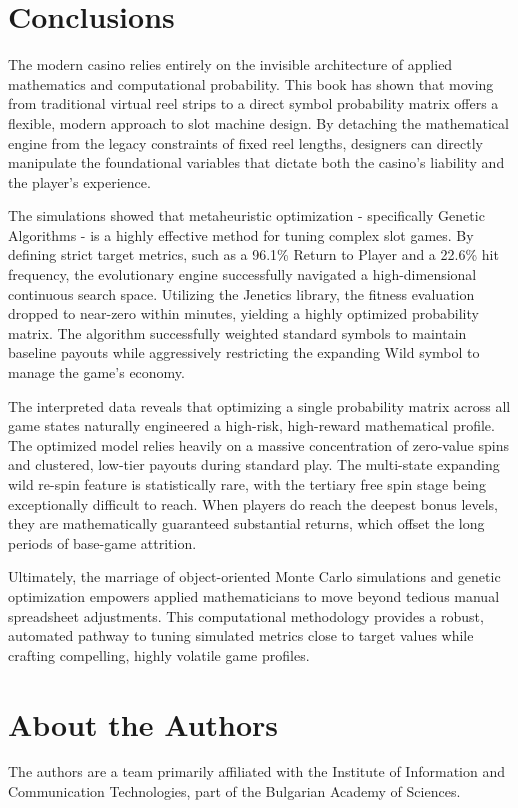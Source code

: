 \documentclass[12pt,twoside,openany]{book}
\begin{document}
\chapter{Conclusions}

The modern casino relies entirely on the invisible architecture of applied mathematics and computational probability. This book has shown that moving from traditional virtual reel strips to a direct symbol probability matrix offers a flexible, modern approach to slot machine design. By detaching the mathematical engine from the legacy constraints of fixed reel lengths, designers can directly manipulate the foundational variables that dictate both the casino's liability and the player's experience.

The simulations showed that metaheuristic optimization - specifically Genetic Algorithms - is a highly effective method for tuning complex slot games. By defining strict target metrics, such as a 96.1\% Return to Player and a 22.6\% hit frequency, the evolutionary engine successfully navigated a high-dimensional continuous search space. Utilizing the Jenetics library, the fitness evaluation dropped to near-zero within minutes, yielding a highly optimized probability matrix. The algorithm successfully weighted standard symbols to maintain baseline payouts while aggressively restricting the expanding Wild symbol to manage the game's economy.

The interpreted data reveals that optimizing a single probability matrix across all game states naturally engineered a high-risk, high-reward mathematical profile. The optimized model relies heavily on a massive concentration of zero-value spins and clustered, low-tier payouts during standard play. The multi-state expanding wild re-spin feature is statistically rare, with the tertiary free spin stage being exceptionally difficult to reach. When players do reach the deepest bonus levels, they are mathematically guaranteed substantial returns, which offset the long periods of base-game attrition.

Ultimately, the marriage of object-oriented Monte Carlo simulations and genetic optimization empowers applied mathematicians to move beyond tedious manual spreadsheet adjustments. This computational methodology provides a robust, automated pathway to tuning simulated metrics close to target values while crafting compelling, highly volatile game profiles.

\backmatter

\chapter*{About the Authors}
\thispagestyle{empty}
The authors are a team primarily affiliated with the Institute of Information and Communication Technologies, part of the Bulgarian Academy of Sciences.
\end{document}
